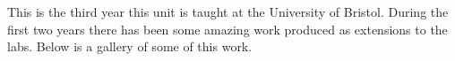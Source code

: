 \documentclass[presentation]{beamer}
\author{Carl Henrik Ek}
\date{\today}
\title{}
\begin{document}
This is the third year this unit is taught at the University of Bristol. During the first two years there has been some amazing work produced as extensions to the labs. Below is a gallery of some of this work.
\end{document}

